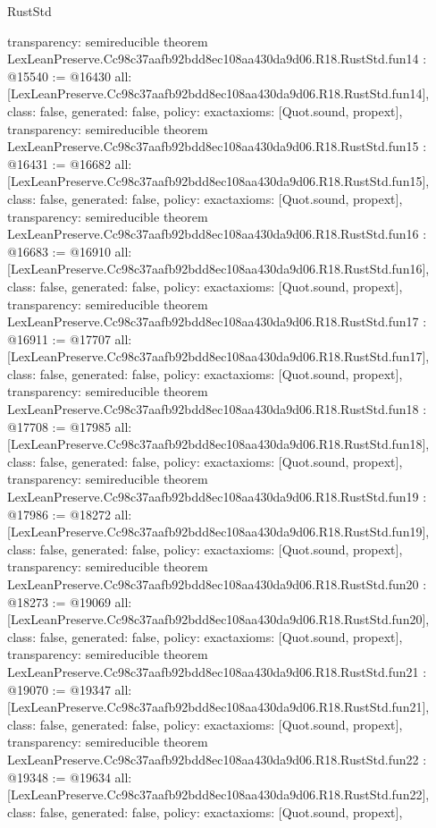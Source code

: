 \begin{lexlean}{RustStd}
\begin{coremodule}
{  transparency: semireducible
}
theorem LexLeanPreserve.Cc98c37aafb92bdd8ec108aa430da9d06.R18.RustStd.fun14 : @15540 := @16430 {
  all: [LexLeanPreserve.Cc98c37aafb92bdd8ec108aa430da9d06.R18.RustStd.fun14],
  class: false,
  generated: false,
  policy: exact{axioms: [Quot.sound, propext]},
  transparency: semireducible
}
theorem LexLeanPreserve.Cc98c37aafb92bdd8ec108aa430da9d06.R18.RustStd.fun15 : @16431 := @16682 {
  all: [LexLeanPreserve.Cc98c37aafb92bdd8ec108aa430da9d06.R18.RustStd.fun15],
  class: false,
  generated: false,
  policy: exact{axioms: [Quot.sound, propext]},
  transparency: semireducible
}
theorem LexLeanPreserve.Cc98c37aafb92bdd8ec108aa430da9d06.R18.RustStd.fun16 : @16683 := @16910 {
  all: [LexLeanPreserve.Cc98c37aafb92bdd8ec108aa430da9d06.R18.RustStd.fun16],
  class: false,
  generated: false,
  policy: exact{axioms: [Quot.sound, propext]},
  transparency: semireducible
}
theorem LexLeanPreserve.Cc98c37aafb92bdd8ec108aa430da9d06.R18.RustStd.fun17 : @16911 := @17707 {
  all: [LexLeanPreserve.Cc98c37aafb92bdd8ec108aa430da9d06.R18.RustStd.fun17],
  class: false,
  generated: false,
  policy: exact{axioms: [Quot.sound, propext]},
  transparency: semireducible
}
theorem LexLeanPreserve.Cc98c37aafb92bdd8ec108aa430da9d06.R18.RustStd.fun18 : @17708 := @17985 {
  all: [LexLeanPreserve.Cc98c37aafb92bdd8ec108aa430da9d06.R18.RustStd.fun18],
  class: false,
  generated: false,
  policy: exact{axioms: [Quot.sound, propext]},
  transparency: semireducible
}
theorem LexLeanPreserve.Cc98c37aafb92bdd8ec108aa430da9d06.R18.RustStd.fun19 : @17986 := @18272 {
  all: [LexLeanPreserve.Cc98c37aafb92bdd8ec108aa430da9d06.R18.RustStd.fun19],
  class: false,
  generated: false,
  policy: exact{axioms: [Quot.sound, propext]},
  transparency: semireducible
}
theorem LexLeanPreserve.Cc98c37aafb92bdd8ec108aa430da9d06.R18.RustStd.fun20 : @18273 := @19069 {
  all: [LexLeanPreserve.Cc98c37aafb92bdd8ec108aa430da9d06.R18.RustStd.fun20],
  class: false,
  generated: false,
  policy: exact{axioms: [Quot.sound, propext]},
  transparency: semireducible
}
theorem LexLeanPreserve.Cc98c37aafb92bdd8ec108aa430da9d06.R18.RustStd.fun21 : @19070 := @19347 {
  all: [LexLeanPreserve.Cc98c37aafb92bdd8ec108aa430da9d06.R18.RustStd.fun21],
  class: false,
  generated: false,
  policy: exact{axioms: [Quot.sound, propext]},
  transparency: semireducible
}
theorem LexLeanPreserve.Cc98c37aafb92bdd8ec108aa430da9d06.R18.RustStd.fun22 : @19348 := @19634 {
  all: [LexLeanPreserve.Cc98c37aafb92bdd8ec108aa430da9d06.R18.RustStd.fun22],
  class: false,
  generated: false,
  policy: exact{axioms: [Quot.sound, propext]},
}
\end{coremodule}
\end{lexlean}
